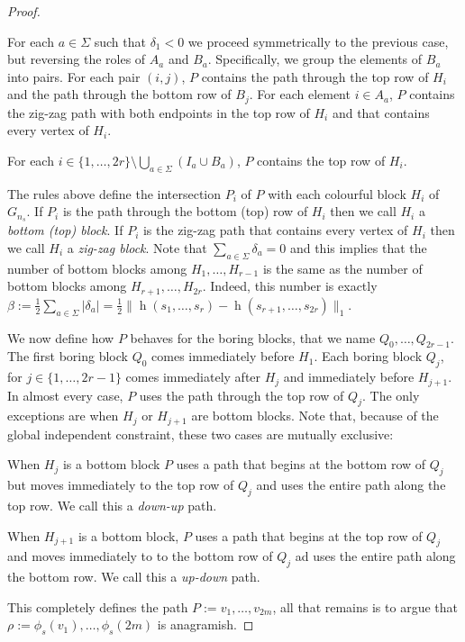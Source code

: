 \documentclass{patmorin}
\DeclareMathOperator{\hist}{h}
\begin{document}
\begin{proof}
\begin{compactenum}
        \item For each $a\in\Sigma$ such that $\delta_1<0$ we proceed symmetrically to the previous case, but reversing the roles of $A_a$ and $B_a$.  Specifically, we group the elements of $B_a$ into pairs.  For each pair $(i,j)$, $P$ contains the path through the top row of $H_i$ and the path through the bottom row of $B_j$.  For each element $i\in A_a$, $P$ contains the zig-zag path with both endpoints in the top row of $H_i$ and that contains every vertex of $H_i$.

        \item For each $i\in\{1,\ldots,2r\}\setminus\bigcup_{a\in\Sigma}(I_a\cup B_a)$, $P$ contains the top row of $H_i$.
    \end{compactenum}
    The rules above define the intersection $P_i$ of $P$ with each colourful block $H_i$ of $G_{n_s}$.  If $P_i$ is the path through the bottom (top) row of $H_i$ then we call $H_i$ a \emph{bottom (top) block}.  If $P_i$ is the zig-zag path that contains every vertex of $H_i$ then we call $H_i$ a \emph{zig-zag block}.  Note that $\sum_{a\in\Sigma} \delta_a = 0$ and this implies that the number of bottom blocks among $H_1,\ldots,H_{r-1}$ is the same as the number of bottom blocks among $H_{r+1},\ldots,H_{2r}$.  Indeed, this number is exactly $\beta:=\tfrac{1}{2}\sum_{a\in\Sigma} |\delta_a|=\tfrac{1}{2}\|\hist(s_1,\ldots,s_r)-\hist(s_{r+1},\ldots,s_{2r})\|_1$.

    We now define how $P$ behaves for the boring blocks, that we name $Q_0,\ldots,Q_{2r-1}$. The first boring block $Q_0$ comes immediately before $H_1$. Each boring block $Q_j$, for $j\in\{1,\ldots,2r-1\}$ comes immediately after $H_j$ and immediately before $H_{j+1}$.  In almost every case, $P$ uses the path through the top row of $Q_j$.  The only exceptions are when $H_j$ or $H_{j+1}$ are bottom blocks. Note that, because of the global independent constraint, these two cases are mutually exclusive:
    \begin{compactenum}
        \item When $H_j$ is a bottom block $P$ uses a path that begins at the bottom row of $Q_j$ but moves immediately to the top row of $Q_j$ and uses the entire path along the top row. We call this a \emph{down-up} path.
        \item When $H_{j+1}$ is a bottom block, $P$ uses a path that begins at the top row of $Q_j$ and moves immediately to to the bottom row of $Q_j$ ad uses the entire path along the bottom row.  We call this a \emph{up-down} path.
    \end{compactenum}
    This completely defines the path $P:=v_1,\ldots,v_{2m}$, all that remains is to argue that $\rho:=\phi_s(v_1),\ldots,\phi_s(2m)$ is anagramish.


\end{proof}
\end{document}
